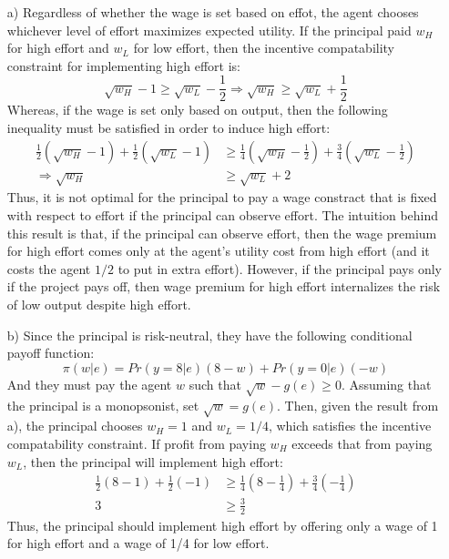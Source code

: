 \documentclass{article}
\begin{document}
\begin{itemize}
	\item[a)] Regardless of whether the wage is set based on effot, the agent chooses whichever level of effort maximizes expected utility. If the principal paid $w_H$ for high effort and $w_L$ for low effort, then the incentive compatability constraint for implementing high effort is:
		\[
			\sqrt{w_H} - 1 \geq \sqrt{w_L} - \frac{1}{2} \Rightarrow \sqrt{w_H} \geq \sqrt{w_L} + \frac{1}{2}
		\]
		Whereas, if the wage is set only based on output, then the following inequality must be satisfied in order to induce high effort:
		\begin{align*}
			\frac{1}{2}\left(\sqrt{w_H} - 1\right) + \frac{1}{2}\left(\sqrt{w_L} - 1\right)
				&\geq\frac{1}{4}\left(\sqrt{w_H} - \frac{1}{2}\right) + \frac{3}{4}\left(\sqrt{w_L} - \frac{1}{2}\right)	\\
			\Rightarrow \sqrt{w_H} &\geq \sqrt{w_L} + 2
		\end{align*}
		Thus, it is not optimal for the principal to pay a wage constract that is fixed with respect to effort if the principal can observe effort. The intuition behind this result is that, if the principal can observe effort, then the wage premium for high effort comes only at the agent's utility cost from high effort (and it costs the agent $1/2$ to put in extra effort). However, if the principal pays only if the project pays off, then wage premium for high effort internalizes the risk of low output despite high effort.
	
	\item[b)] Since the principal is risk-neutral, they have the following conditional payoff function:
		\[
			\pi(w|e) = Pr\left(y=8|e\right)(8-w) + Pr\left(y=0|e\right)(-w)
		\]
		And they must pay the agent $w$ such that ${\sqrt{w}-g(e)\geq 0}$. Assuming that the principal is a monopsonist, set ${\sqrt{w} = g(e)}$. Then, given the result from a), the principal chooses ${w_H=1}$ and ${w_L=1/4}$, which satisfies the incentive compatability constraint. If profit from paying $w_H$ exceeds that from paying $w_L$, then the principal will implement high effort:
		\begin{align*}
			\frac{1}{2}(8-1) + \frac{1}{2}(-1)	&\geq \frac{1}{4}\left(8-\frac{1}{4}\right) + \frac{3}{4}\left(-\frac{1}{4}\right)	\\
											3	&\geq \frac{3}{2}
		\end{align*}
		Thus, the principal should implement high effort by offering only a wage of 1 for high effort and a wage of 1/4 for low effort.
	

\end{itemize}
\end{document}
